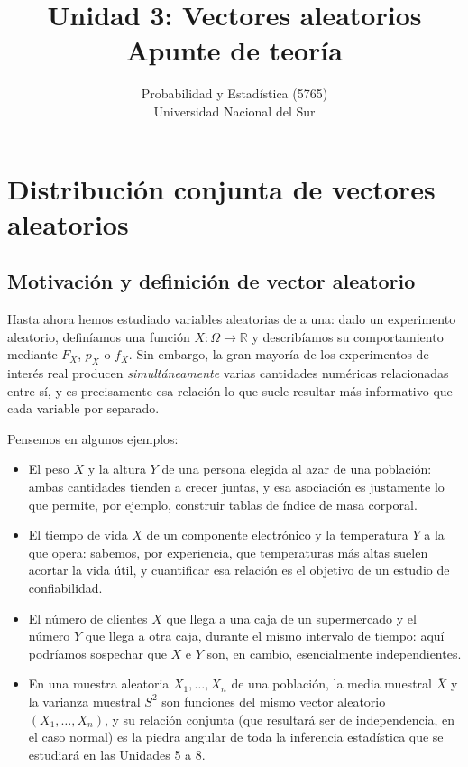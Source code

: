 \documentclass[11pt,a4paper]{article}
\title{Unidad 3: Vectores aleatorios \\ \large Apunte de teoría}
\author{Probabilidad y Estadística (5765) \\ Universidad Nacional del Sur}
\date{}
\theoremstyle{plain}
\theoremstyle{definition}
\theoremstyle{remark}
\begin{document}
\maketitle
\tableofcontents
\newpage

\section{Distribución conjunta de vectores aleatorios}

\subsection{Motivación y definición de vector aleatorio}

Hasta ahora hemos estudiado variables aleatorias de a una: dado un experimento aleatorio, definíamos una función $X:\Omega\to\mathbb{R}$ y describíamos su comportamiento mediante $F_X$, $p_X$ o $f_X$. Sin embargo, la gran mayoría de los experimentos de interés real producen \emph{simultáneamente} varias cantidades numéricas relacionadas entre sí, y es precisamente esa relación lo que suele resultar más informativo que cada variable por separado.

Pensemos en algunos ejemplos:
\begin{itemize}
\item El peso $X$ y la altura $Y$ de una persona elegida al azar de una población: ambas cantidades tienden a crecer juntas, y esa asociación es justamente lo que permite, por ejemplo, construir tablas de índice de masa corporal.
\item El tiempo de vida $X$ de un componente electrónico y la temperatura $Y$ a la que opera: sabemos, por experiencia, que temperaturas más altas suelen acortar la vida útil, y cuantificar esa relación es el objetivo de un estudio de confiabilidad.
\item El número de clientes $X$ que llega a una caja de un supermercado y el número $Y$ que llega a otra caja, durante el mismo intervalo de tiempo: aquí podríamos sospechar que $X$ e $Y$ son, en cambio, esencialmente independientes.
\item En una muestra aleatoria $X_1,\dots,X_n$ de una población, la media muestral $\bar X$ y la varianza muestral $S^2$ son funciones del mismo vector aleatorio $(X_1,\dots,X_n)$, y su relación conjunta (que resultará ser de independencia, en el caso normal) es la piedra angular de toda la inferencia estadística que se estudiará en las Unidades 5 a 8.
\end{itemize}
\end{document}
